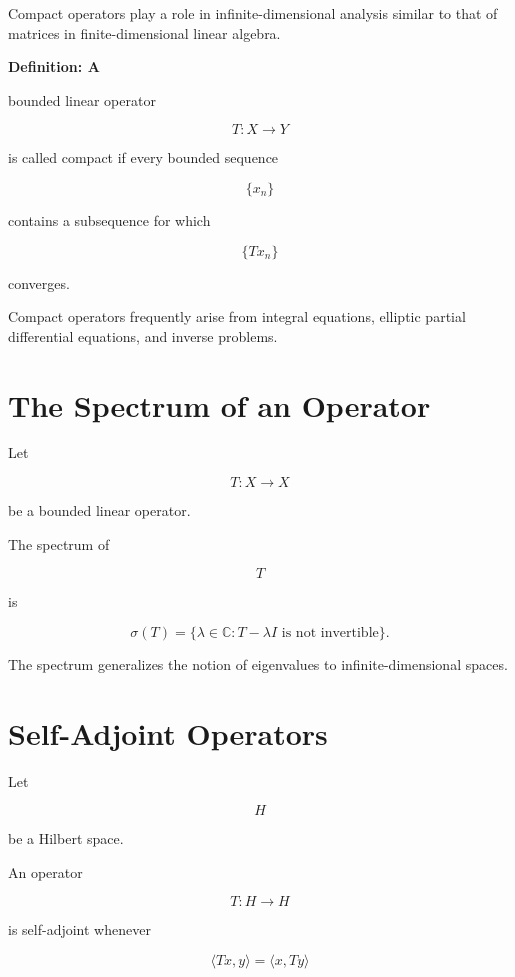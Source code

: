 \documentclass[11pt,fleqn]{book}
\numberwithin{equation}{chapter}
\newenvironment{definition}[1]
  {\begin{definitionEnv}
   \noindent\textbf{Definition: #1}\par\smallskip}
  {\end{definitionEnv}}
\theoremstyle{plain}
\theoremstyle{definition}
\theoremstyle{remark}
\begin{document}
Compact operators play a role in infinite-dimensional analysis similar
to that of matrices in finite-dimensional linear algebra.

\begin{definition}

A bounded linear operator

\[
T:X\rightarrow Y
\]

is called compact if every bounded sequence

\[
\{x_n\}
\]

contains a subsequence for which

\[
\{Tx_n\}
\]

converges.

\end{definition}

Compact operators frequently arise from integral equations,
elliptic partial differential equations,
and inverse problems.


\section{The Spectrum of an Operator}

Let

\[
T:X\rightarrow X
\]

be a bounded linear operator.

The spectrum of

\[
T
\]

is

\[
\boxed{
\sigma(T)
=
\{
\lambda\in\mathbb C
:
T-\lambda I
\text{ is not invertible}
\}.
}
\]

The spectrum generalizes the notion of eigenvalues to
infinite-dimensional spaces.


\section{Self-Adjoint Operators}

Let

\[
H
\]

be a Hilbert space.

An operator

\[
T:H\rightarrow H
\]

is self-adjoint whenever

\[
\boxed{
\langle Tx,y\rangle
=
\langle x,Ty\rangle
}
\]
\end{document}
